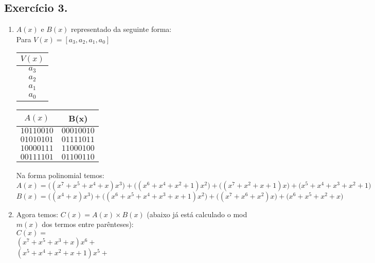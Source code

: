 \documentclass[12pt]{article}
\begin{document}
	\subsection*{Exercício 3.}
		\begin{enumerate}
			\item
			$A(x)$ e $B(x)$ representado da seguinte forma:\\
			Para $V(x) = [a_3, a_2, a_1, a_0]$
			
			\begin{table}[h]
				\centering
				\vspace{0.5cm}
				\begin{tabular}{c}
				$V(x)$\\
				\hline                               
					$a_3$\\
					$a_2$\\
					$a_1$\\
					$a_0$\\
				\end{tabular}
			\end{table}
			\subitem
				\begin{table}[h]
					\centering
					\vspace{0.5cm}
					\begin{tabular}{c|c}
					$A(x)$ & B(x) \\
					\hline                               
						$10110010$ & $00010010$\\
						$01010101$   & $01111011$ \\
						$10000111$ & $11000100$  \\	
						$00111101$  & $01100110$   \\
					\end{tabular}
				\end{table}
			\newline
			Na forma polinomial temos:
			$$A(x) = \big((x^7 + x^5 + x^4 + x)x^3\big) + \big((x^6 + x^4 + x^2 + 1)x^2\big) + \big((x^7 + x^2 + x + 1)x\big) + \big(x^5 + x^4 + x^3 + x^2 + 1\big)$$
			$$B(x) = \big((x^4 + x)x^3\big) + \big((x^6 + x^5 + x^4 + x^3 + x + 1)x^2\big) + \big((x^7 + x^6 + x^2)x\big) + \big(x^6 + x^5 + x^2 + x\big)$$
			\item
				Agora temos: $C(x) = A(x) \times B(x)$ (abaixo já está calculado o mod $m(x)$ dos termos entre parênteses):\\
				$C(x) = $\\
				$(x^7 + x^5 + x^3 + x)x^6 +$\\
				$(x^5 + x^4 + x^2 + x + 1)x^5 +$\\

\end{enumerate}
\end{document}
